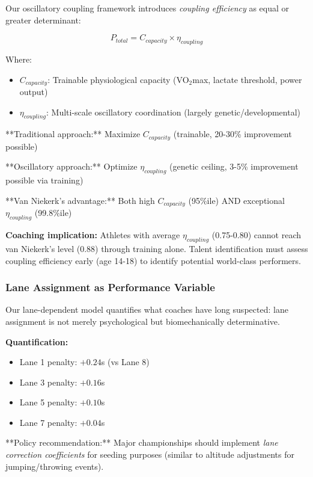 Our oscillatory coupling framework introduces \textit{coupling efficiency} as equal or greater determinant:

\begin{equation}
P_{total} = C_{capacity} \times \eta_{coupling}
\end{equation}

Where:
\begin{itemize}
    \item $C_{capacity}$: Trainable physiological capacity (VO$_2$max, lactate threshold, power output)
    \item $\eta_{coupling}$: Multi-scale oscillatory coordination (largely genetic/developmental)
\end{itemize}

**Traditional approach:** Maximize $C_{capacity}$ (trainable, 20-30\% improvement possible)

**Oscillatory approach:** Optimize $\eta_{coupling}$ (genetic ceiling, 3-5\% improvement possible via training)

**Van Niekerk's advantage:** Both high $C_{capacity}$ (95\%ile) AND exceptional $\eta_{coupling}$ (99.8\%ile)

\textbf{Coaching implication:} Athletes with average $\eta_{coupling}$ (0.75-0.80) cannot reach van Niekerk's level (0.88) through training alone. Talent identification must assess coupling efficiency early (age 14-18) to identify potential world-class performers.

\subsubsection{Lane Assignment as Performance Variable}

Our lane-dependent model quantifies what coaches have long suspected: lane assignment is not merely psychological but biomechanically determinative.

\textbf{Quantification:}
\begin{itemize}
    \item Lane 1 penalty: $+0.24$s (vs Lane 8)
    \item Lane 3 penalty: $+0.16$s
    \item Lane 5 penalty: $+0.10$s
    \item Lane 7 penalty: $+0.04$s
\end{itemize}

**Policy recommendation:** Major championships should implement \textit{lane correction coefficients} for seeding purposes (similar to altitude adjustments for jumping/throwing events).

